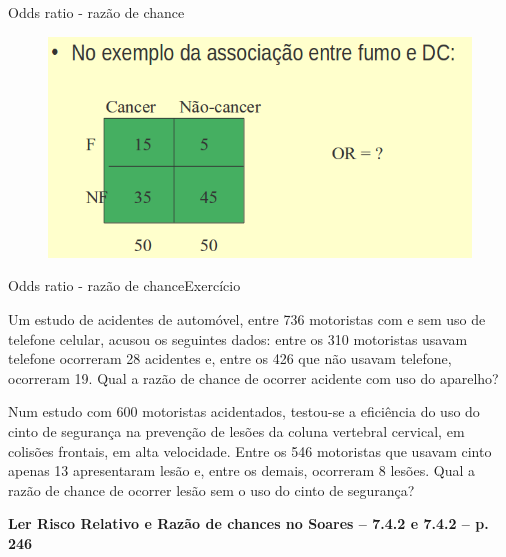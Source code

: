 \documentclass[9pt]{beamer}
\begin{document}
\begin{frame}{Odds ratio - razão de chance}{}

\begin{figure}[!htb]
    \centering
    \includegraphics[scale=0.45]{odds.png}
  \end{figure}
\end{frame}



\begin{frame}{Odds ratio - razão de chance}{Exercício}


Um estudo de acidentes de automóvel, entre 736 motoristas com e sem uso
de telefone celular, acusou os seguintes dados: entre os 310 motoristas
usavam telefone ocorreram 28 acidentes e, entre os 426 que não usavam
telefone, ocorreram 19. Qual a razão de chance de ocorrer acidente com
uso do aparelho?\\
\indent

Num estudo com 600 motoristas acidentados, testou-se a eficiência do
uso do cinto de segurança na prevenção de lesões da coluna vertebral
cervical, em colisões frontais, em alta velocidade.
Entre os 546 motoristas que usavam cinto apenas 13 apresentaram lesão e,
entre os demais, ocorreram 8 lesões. Qual a razão de chance de ocorrer
lesão sem o uso do cinto de segurança?\\
\indent


\textbf{Ler Risco Relativo e Razão de chances no Soares – 7.4.2 e 7.4.2
– p. 246}

\end{frame}
\end{document}
